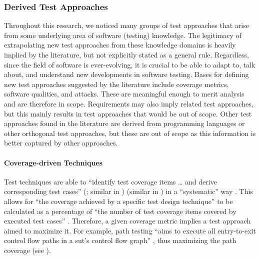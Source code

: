 \subsubsection{Derived Test Approaches}
\label{derived-tests}

Throughout this research, we noticed many groups of test approaches that arise
from some underlying area of software (testing) knowledge. The legitimacy of
extrapolating new test approaches from these knowledge domains is heavily
implied by the literature, but not explicitly stated as a general rule. Regardless,
since the field of software is ever-evolving, it is crucial to be able to
adapt to, talk about, and understand new developments in software testing.
Bases for defining new test approaches suggested by the literature include
coverage metrics, software qualities, and attacks. These are meaningful
enough to merit analysis and are therefore in scope. Requirements may also
imply related test approaches, but this mainly results in test approaches
that would be out of scope. Other test approaches found in the literature
are derived from programming languages or other orthogonal test approaches,
but these are out of scope as this information is better captured by other
approaches.

\ifnotpaper
\paragraph{Coverage-driven Techniques}\label{cov-test}

Test techniques are able to ``identify test coverage items \dots{} and
derive corresponding test cases''
\ifnotpaper
    (\citealp[p.~11]{IEEE2022}; similar in \citeyear[p.~467]{IEEE2017})
\else
    \cite[p.~11]{IEEE2022} (similar in \cite[p.~467]{IEEE2017})
\fi
in a ``systematic'' way
\citeyearpar[p.~464]{IEEE2017}.
\ifnotpaper
    This allows for ``the coverage achieved by a specific test design
    technique'' to be calculated as a percentage of ``the number of test
    coverage items covered by executed test cases'' \citeyearpar[p.~30]{IEEE2021}.
\fi %
Therefore, a given coverage metric implies a test approach aimed to
maximize it. For example, path testing ``aims to execute all entry-to-exit
control flow paths in a \acs{sut}'s control flow graph'' \citep[p.~5-13]{SWEBOK2024},
thus maximizing the path coverage
\ifnotpaper
    \citep[see][Fig.~1]{SharmaEtAl2021}\else
    (see \cite[Fig.~1]{SharmaEtAl2021})\fi.

